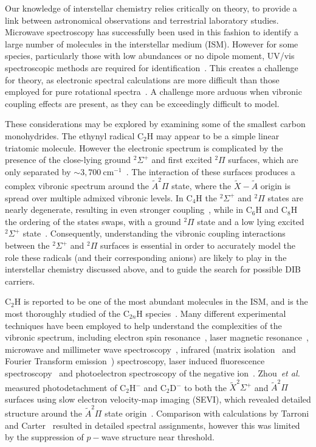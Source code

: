 \documentclass[aip,graphicx]{revtex4-1}
\begin{document}
Our knowledge of interstellar chemistry relies critically on theory, to provide a link between astronomical observations and terrestrial laboratory studies. Microwave spectroscopy has successfully been used in this fashion to identify a large number of molecules in the interstellar medium (ISM). However for some species, particularly those with low abundances or no dipole moment, UV/vis spectroscopic methods are required for identification~\cite{mai97}. This creates a challenge for theory, as electronic spectral calculations are more difficult than those employed for pure rotational spectra~\cite{for10}. A challenge more arduous when vibronic coupling effects are present, as they can be exceedingly difficult to model.

These considerations may be explored by examining some of the smallest carbon monohydrides. The ethynyl radical C$_2$H may appear to be a simple linear triatomic molecule. However the electronic spectrum is complicated by the presence of the close-lying ground $^2\Sigma^+$ and first excited $^2\Pi$ surfaces, which are only separated by $\sim3,700~$cm$^{-1}$~\cite{cur85,tar03}. The interaction of these surfaces produces a complex vibronic spectrum around the $\tilde{A}^2\Pi$ state, where the $\tilde{X}-\tilde{A}$ origin is spread over multiple admixed vibronic levels. In C$_4$H the $^2\Sigma^+$ and $^2\Pi$ states are nearly degenerate, resulting in even stronger coupling~\cite{zho07b}, while in C$_6$H and C$_8$H the ordering of the states swaps, with a ground $^2\Pi$ state and a low lying excited $^2\Sigma^+$ state~\cite{lin99,tay98}. Consequently, understanding the vibronic coupling interactions between the $^2\Sigma^+$ and $^2\Pi$ surfaces is essential in order to accurately model the role these radicals (and their corresponding anions) are likely to play in the interstellar chemistry discussed above, and to guide the search for possible DIB carriers.

C$_2$H is reported to be one of the most abundant molecules in the ISM, and is the most thoroughly studied of the C$_{2n}$H species~\cite{wil91,hei99,for10}. Many different experimental techniques have been employed to help understand the complexities of the vibronic spectrum, including electron spin resonance~\cite{coc64,jin85}, laser magnetic resonance~\cite{bro88,pfe96,sch98}, microwave and millimeter wave spectroscopy~\cite{sas81,got83,end89,mul00}, infrared (matrix isolation~\cite{she87,jac87,for95} and Fourier Transform emission~\cite{ver88}) spectroscopy, laser induced fluorescence spectroscopy~\cite{hsu93,hsu95,chi99} and photoelectron spectroscopy of the negative ion~\cite{erv91,tay98,zho07}. Zhou~\emph{et al.} measured photodetachment of C$_2$H$^-$ and C$_2$D$^-$ to both the $\tilde{X} ^2\Sigma^+$ and $\tilde{A} ^2\Pi$ surfaces using slow electron velocity-map imaging (SEVI), which revealed detailed structure around the $\tilde{A} ^2\Pi$ state origin~\cite{zho07}. Comparison with calculations by Tarroni and Carter~\cite{tar03} resulted in detailed spectral assignments, however this was limited by the suppression of $p-$wave structure near threshold.
\end{document}
